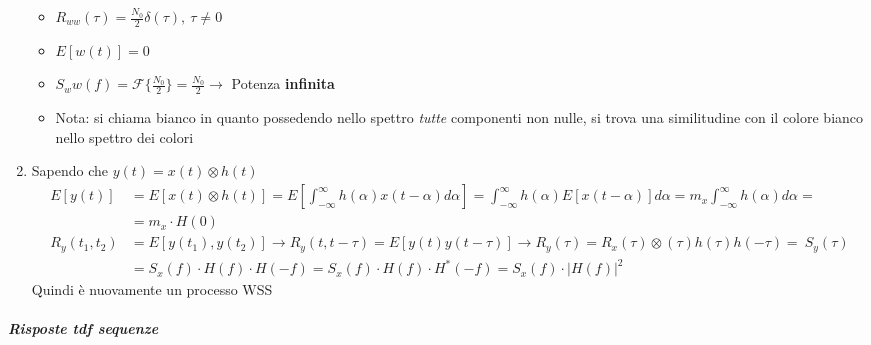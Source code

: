 \documentclass[
]{article}
\begin{document}
\begin{enumerate}
  \begin{itemize}
  \item
    \(R_{ww}(\tau) = \frac{N_0}{2} \delta(\tau), \ \tau \neq 0\)
  \item
    \(E[w(t)] = 0\)
  \item
    \(S_ww(f) = \mathcal{F} \{\frac{N_0}{2}\} = \frac{N_0}{2} \to\)
    Potenza \textbf{infinita}
  \item
    Nota: si chiama bianco in quanto possedendo nello spettro
    \emph{tutte} componenti non nulle, si trova una similitudine con il
    colore bianco nello spettro dei colori
  \end{itemize}
\item
  Sapendo che \(y(t) = x(t) \otimes h(t)\) \begin{align*}
  E[y(t)] &= E[x(t)\otimes h(t)] = E[\int_{-\infty}^{\infty} h(\alpha)x(t - \alpha) d\alpha]
  = \int_{-\infty}^{\infty} h(\alpha)E[x(t - \alpha)] d\alpha =
     m_x \int_{-\infty}^{\infty} h(\alpha) d\alpha =\\&= m_x \cdot H(0)
  \\ R_y(t_1, t_2) &= E[y(t_1), y(t_2)] \to R_y(t, t-\tau) =
    E[y(t)y(t-\tau)] \to R_y(\tau) = R_x(\tau) \otimes (\tau) h(\tau) h(-\tau)=
  \ S_y(\tau) \\ &= S_x(f) \cdot H(f) \cdot H(-f) = S_x(f) \cdot H(f) \cdot H^*(-f) = S_x(f) \cdot |H(f)|^2
  \end{align*} Quindi è nuovamente un processo WSS
\end{enumerate}

\subparagraph{Risposte tdf sequenze}\label{risposte-tdf-sequenze}
\end{document}
